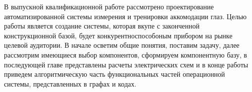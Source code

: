 В  выпускной  квалификационной  работе рассмотрено проектирование автоматизированной системы измерения и тренировки аккомодации глаз. Целью работы является создание системы, которая вкупе с законченной конструкционной базой, будет конкурентноспособоным прибором на рынке целевой аудитории. В начале осветим общие понятия, поставим задачу, далее рассмотрим имеющиеся выбор компонентов, сформируем компонентную базу, в последующей главе представлены расчеты электрических схем и в конце работы приведем алгоритмическую часть функциональных частей операционной системы, представленных в графах и кодах.


